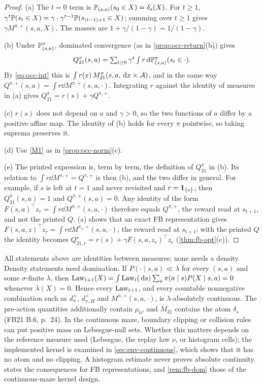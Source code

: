 \begin{proof}
(a) The $t=0$ term is $\mathbb{P}_{(s,a)}(s_0\in X)=\delta_s(X)$.
For $t\ge1$, $\gamma^t\mathbb{P}(s_t\in X)=\gamma\cdot\gamma^{t-1}\mathbb{P}(s_{(t-1)+1}\in X)$; summing over $t\ge1$ gives $\gamma M^{\pi,+}(s,a,X)$.
The masses are $1+\gamma/(1-\gamma)=1/(1-\gamma)$.

(b) Under $\mathbb{P}^\pi_{(s,a)}$, dominated convergence (as in \cref{prop:occ-return}(b)) gives
\[
Q^\pi_{21}(s,a)=\textstyle\sum_{t\ge0}\gamma^t\int r\,\mathrm{d}\mathbb{P}^\pi_{(s,a)}(s_t\in\cdot).
\]
By \eqref{eq:occ-int} this is $\int r(x)\,M^\pi_{21}(s,a,\,\mathrm{d} x\times\mathcal{A})$, and in the same way $Q^{\pi,+}(s,a)=\int r\dd M^{\pi,+}(s,a,\cdot)$.
Integrating $r$ against the identity of measures in (a) gives $Q^\pi_{21}=r(s)+\gamma Q^{\pi,+}$.

(c) $r(s)$ does not depend on $a$ and $\gamma>0$, so the two functions of $a$ differ by a positive affine map.
The identity of (b) holds for every $\pi$ pointwise, so taking suprema preserves it.

(d) Use \ref{M1} as in \cref{prop:occ-norm}(c).

(e) The printed expression is, term by term, the definition of $Q^\pi_{21}$ in (b).
Its relation to $\int r\dd M^{\pi,+}=Q^{\pi,+}$ is then (b), and the two differ in general.
For example, if $s$ is left at $t=1$ and never revisited and $r=\mathbf{1}_{\{s\}}$, then $Q^\pi_{21}(s,a)=1$ and $Q^{\pi,+}(s,a)=0$.
Any identity of the form $F(s,a)^\top z_r=\int r\dd M^{\pi,+}(s,a,\cdot)$ therefore equals $Q^{\pi,+}$, the reward read at $s_{t+1}$, and not the printed $Q$.
(a) shows that an exact FB representation gives $F(s,a,z)^\top z_r=\int r\dd M^{\pi_z,+}(s,a,\cdot)$, the reward read at $s_{t+1}$; with the printed $Q$ the identity becomes $Q^\star_{21,r}=r(s)+\gamma F(s,a,z_r)^\top z_r$ (\cref{thm:fb-opt}(c)).
\end{proof}

\begin{remark}\label{rem:occ-density}
All statements above are identities between measures; none needs a density.
Density statements need domination. If $P(\cdot\mid s,a)\ll\lambda$ for every $(s,a)$ and some $\sigma$-finite $\lambda$, then
$\mathrm{Law}_{t+1}(X)=\int\mathrm{Law}_t(\,\mathrm{d} s)\sum_a\pi(a\mid s)P(X\mid s,a)=0$ whenever $\lambda(X)=0$.
Hence every $\mathrm{Law}_{t+1}$, and every countable nonnegative combination such as $d^+_\pi$, $d^+_{\pi,H}$ and $M^{\pi,+}(s,a,\cdot)$, is $\lambda$-absolutely continuous.
The pre-action quantities additionally contain $\mu_0$, and $M_{21}$ contains the atom $\delta_s$ (FB21 B.6, p.~24).
In the continuous maze, boundary clipping or collision rules can put positive mass on Lebesgue-null sets.
Whether this matters depends on the reference measure used (Lebesgue, the replay law $\nu$, or histogram cells); the implemented kernel is examined in \cref{sec:env-continuous}, which shows that it has no atom and no clipping.
A histogram estimate never proves absolute continuity.
 states the consequences for FB representations, and \cref{rem:fb-dom} those of the continuous-maze kernel design.
\end{remark}
